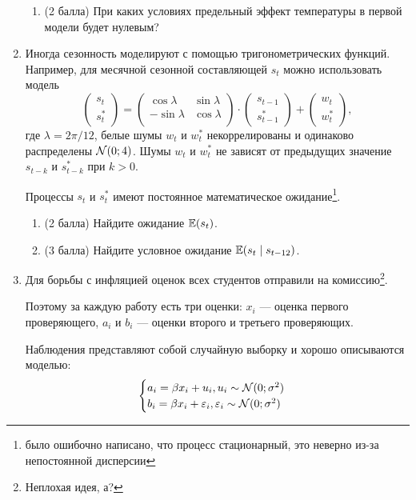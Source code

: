\begin{enumerate}
\begin{enumerate}
    \item (2 балла) При каких условиях предельный эффект температуры в первой модели будет нулевым?
    
\end{enumerate}



\item  %

Иногда сезонность моделируют с помощью тригонометрических функций. Например, для месячной сезонной составляющей $s_t$ можно использовать модель
\[
\begin{pmatrix}
s_t \\
s_t^*
\end{pmatrix} = 
\begin{pmatrix}
\cos \lambda & \sin \lambda \\
-\sin \lambda & \cos \lambda \\
\end{pmatrix} \cdot 
\begin{pmatrix}
s_{t-1} \\
s_{t-1}^*
\end{pmatrix} +
\begin{pmatrix}
w_t \\
w_t^*
\end{pmatrix},   
\]
где $\lambda = 2\pi/12$, белые шумы $w_t$ и $w_t^*$ некоррелированы и одинаково распределены $\mathcal{N}(0;4)$. Шумы $w_t$ и $w_t^*$ не зависят от предыдущих значение $s_{t-k}$ и $s_{t-k}^*$ при $k>0$.

Процессы $s_t$ и $s_t^*$ имеют постоянное математическое ожидание\footnote{было ошибочно написано, что процесс стационарный, это неверно из-за непостоянной дисперсии}. 

\begin{enumerate}
    \item (2 балла) Найдите ожидание $\operatorname{\mathbb{E}} (s_t)$.
    \item (3 балла) Найдите условное ожидание $\operatorname{\mathbb{E}}(s_t \mid s_{t-12})$.
\end{enumerate}


\item %
Для борьбы с инфляцией оценок всех студентов отправили на комиссию\footnote{Неплохая идея, а?}.

Поэтому за каждую работу есть три оценки: $x_i$ — оценка первого проверяющего, $a_i$ и $b_i$ — оценки второго и третьего проверяющих. 

Наблюдения представляют собой случайную выборку и хорошо описываются моделью:
\[
\begin{cases}
a_i = \beta x_i + u_i, u_i \sim \mathcal{N}(0; \sigma^2) \\
b_i = \beta x_i + \varepsilon_i, \varepsilon_i \sim \mathcal{N}(0; \sigma^2) \\
\end{cases}
\]


\end{enumerate}

